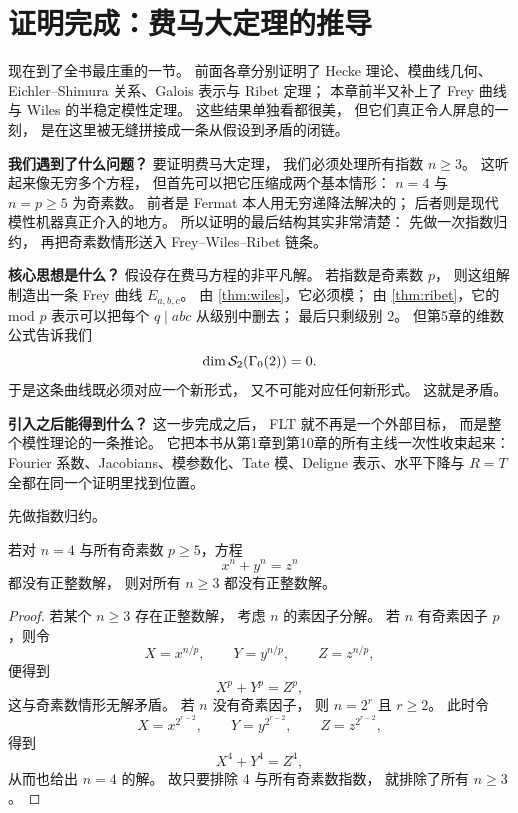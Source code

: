 \section{证明完成：费马大定理的推导}
\label{sec:ch10-proof}

\providecommand{\rhobar}{\bar{\rho}}

现在到了全书最庄重的一节。
前面各章分别证明了 Hecke 理论、模曲线几何、Eichler--Shimura 关系、Galois 表示与 Ribet 定理；
本章前半又补上了 Frey 曲线与 Wiles 的半稳定模性定理。
这些结果单独看都很美，
但它们真正令人屏息的一刻，
是在这里被无缝拼接成一条从假设到矛盾的闭链。

\textbf{我们遇到了什么问题？}
要证明费马大定理，
我们必须处理所有指数 $n\ge 3$。
这听起来像无穷多个方程，
但首先可以把它压缩成两个基本情形：
$n=4$ 与 $n=p\ge 5$ 为奇素数。
前者是 Fermat 本人用无穷递降法解决的；
后者则是现代模性机器真正介入的地方。
所以证明的最后结构其实非常清楚：
先做一次指数归约，
再把奇素数情形送入 Frey--Wiles--Ribet 链条。

\textbf{核心思想是什么？}
假设存在费马方程的非平凡解。
若指数是奇素数 $p$，
则这组解制造出一条 Frey 曲线 $E_{a,b,c}$。
由 \cref{thm:wiles}，它必须模；
由 \cref{thm:ribet}，它的 mod $p$ 表示可以把每个 $q\mid abc$ 从级别中删去；
最后只剩级别 $2$。
但第5章的维数公式告诉我们
\[
  \dim \mathcal{S}_2(\Gamma_0(2))=0.
\]
于是这条曲线既必须对应一个新形式，
又不可能对应任何新形式。
这就是矛盾。

\textbf{引入之后能得到什么？}
这一步完成之后，
FLT 就不再是一个外部目标，
而是整个模性理论的一条推论。
它把本书从第1章到第10章的所有主线一次性收束起来：
Fourier 系数、Jacobians、模参数化、Tate 模、Deligne 表示、水平下降与 $R=T$ 全都在同一个证明里找到位置。



先做指数归约。

\begin{lemma}
\label{lem:ch10-reduction}
若对 $n=4$ 与所有奇素数 $p\ge 5$，方程
\[
  x^n+y^n=z^n
\]
都没有正整数解，
则对所有 $n\ge 3$ 都没有正整数解。
\end{lemma}

\begin{proof}
若某个 $n\ge 3$ 存在正整数解，
考虑 $n$ 的素因子分解。
若 $n$ 有奇素因子 $p$，则令
\[
  X=x^{n/p},\qquad Y=y^{n/p},\qquad Z=z^{n/p},
\]
便得到
\[
  X^p+Y^p=Z^p,
\]
这与奇素数情形无解矛盾。
若 $n$ 没有奇素因子，
则 $n=2^r$ 且 $r\ge 2$。
此时令
\[
  X=x^{2^{r-2}},\qquad Y=y^{2^{r-2}},\qquad Z=z^{2^{r-2}},
\]
得到
\[
  X^4+Y^4=Z^4,
\]
从而也给出 $n=4$ 的解。
故只要排除 $4$ 与所有奇素数指数，
就排除了所有 $n\ge 3$。
\end{proof}


